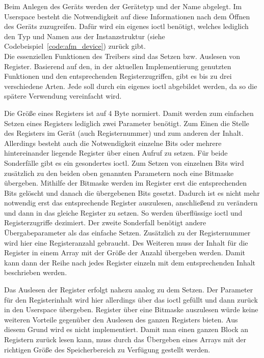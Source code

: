 Beim Anlegen des Geräts werden der Gerätetyp und der Name abgelegt. Im Userspace besteht die Notwendigkeit auf diese Informationen nach dem Öffnen des Geräts zuzugreifen. Dafür wird ein eigenes \ac{ioctl} benötigt, welches lediglich den Typ und Namen aus der Instanzstruktur (siehe Codebeispiel~\ref{code:afm_device}) zurück gibt.\\

Die essenziellen Funktionen des Treibers sind das Setzen bzw. Auslesen von Register. Basierend auf den, in der aktuellen Implementierung genutzten Funktionen und den entsprechenden Registerzugriffen, gibt es bis zu drei verschiedene Arten. Jede soll durch ein eigenes \ac{ioctl} abgebildet werden, da so die spätere Verwendung vereinfacht wird.  

Die Größe eines Registers ist auf 4 Byte normiert. Damit werden zum einfachen Setzen eines Registers lediglich zwei Parameter benötigt. Zum Einen die Stelle des Registers im Gerät (auch Registernummer) und zum anderen der Inhalt. 
Allerdings besteht auch die Notwendigkeit einzelne Bits oder mehrere hintereinander liegende Register über einen Aufruf zu setzen. Für beide Sonderfälle gibt es ein gesondertes \ac{ioctl}. Zum Setzen von einzelnen Bits wird zusätzlich zu den beiden oben genannten Parametern noch eine Bitmaske übergeben. Mithilfe der Bitmaske werden im Register erst die entsprechenden Bits gelöscht und danach die übergebenen Bits gesetzt. Dadurch ist es nicht mehr notwendig erst das entsprechende Register auszulesen, anschließend zu verändern und dann in das gleiche Register zu setzen. So werden überflüssige  \ac{ioctl} und Registerzugriffe dezimiert.
Der zweite Sonderfall benötigt andere Übergabeparameter als das einfache Setzen. Zusätzlich zu der Registernummer wird hier eine Registeranzahl gebraucht. Des Weiteren muss der Inhalt für die Register in einem Array mit der Größe der Anzahl übergeben werden. Damit kann dann der Reihe nach jedes Register einzeln mit dem entsprechenden Inhalt beschrieben werden.


Das Auslesen der Register erfolgt nahezu analog zu dem Setzen. Der Parameter für den Registerinhalt wird hier allerdings über das \ac{ioctl} gefüllt und dann zurück in den Userspace übergeben. 
Register über eine Bitmaske auszulesen würde keine weiteren Vorteile gegenüber den Auslesen des ganzen Registers bieten. Aus diesem Grund wird es nicht implementiert.  
Damit man einen ganzen Block an Registern zurück lesen kann, muss durch das Übergeben eines Arrays mit der richtigen Größe des Speicherbereich zu Verfügung gestellt werden.\\

